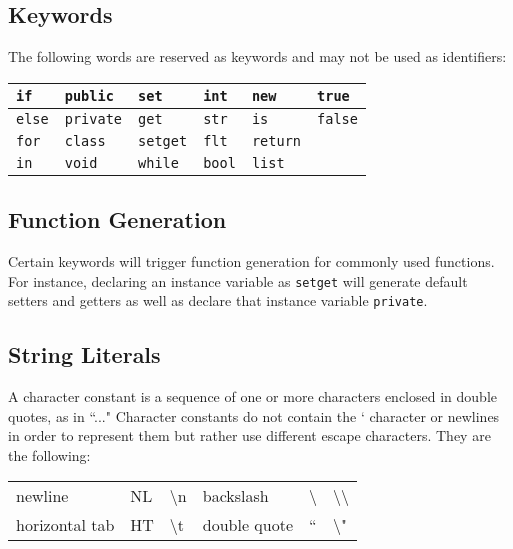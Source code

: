 \documentclass[12pt]{report}
\begin{document}
\subsection{Keywords}

\begin{doublespace}
The following words are reserved as keywords and may not be used as identifiers:
\end{doublespace}

\begin{center}
\begin{onehalfspace}
\begin{tabular}{ | l | l | l | l | l | l | }
\hline
\texttt{if} & \texttt{public} & \texttt{set} & \texttt{int} & \texttt{new} & \texttt{true} \\
\hline
\texttt{else} & \texttt{private} & \texttt{get} & \texttt{str} & \texttt{is} & \texttt{false} \\
\hline
\texttt{for} & \texttt{class} & \texttt{setget} & \texttt{flt} & \texttt{return} & \\
\hline
\texttt{in} & \texttt{void} & \texttt{while} & \texttt{bool} & \texttt{list} & \\
\hline
\end{tabular}
\end{onehalfspace}
\end{center}

\subsection{Function Generation}

\begin{doublespace}
Certain keywords will trigger function generation for commonly used functions. For instance, declaring an instance variable as \texttt{setget} will generate default setters and getters as well as declare that instance variable \texttt{private}.
\end{doublespace}

\subsection{String Literals}

\begin{doublespace}
A character constant is a sequence of one or more characters enclosed in double quotes, as in ``..." Character constants do not contain the ` character or newlines in order to represent them but rather use different escape characters. They are the following:
\begin{flushleft}
\begin{tabular}{ l l l l l l }
newline & NL & \textbackslash n & backslash & \textbackslash & \textbackslash\textbackslash \\
horizontal tab & HT & \textbackslash t & double quote & `` & \textbackslash"
\end{tabular}
\end{flushleft}
\end{doublespace}
\end{document}
